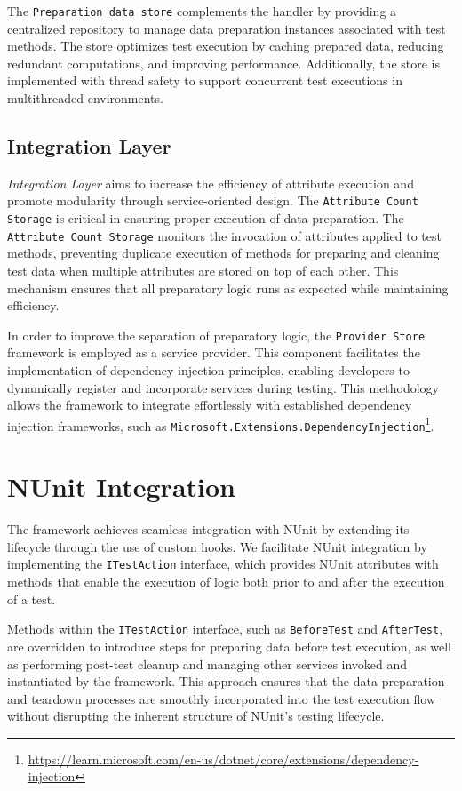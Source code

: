 The \texttt{Preparation data store} complements the handler by providing a centralized repository to manage data preparation instances associated with test methods. The store optimizes test execution by caching prepared data, reducing redundant computations, and improving performance. Additionally, the store is implemented with thread safety to support concurrent test executions in multithreaded environments.

\subsection{Integration Layer}
\textit{Integration Layer} aims to increase the efficiency of attribute execution and promote modularity through service-oriented design.
The \texttt{Attribute Count Storage} is critical in ensuring proper execution of data preparation. The \texttt{Attribute Count Storage} monitors the invocation of attributes applied to test methods, preventing duplicate execution of methods for preparing and cleaning test data when multiple attributes are stored on top of each other. This mechanism ensures that all preparatory logic runs as expected while maintaining efficiency.

In order to improve the separation of preparatory logic, the \texttt{Provider Store} framework is employed as a service provider. This component facilitates the implementation of dependency injection principles, enabling developers to dynamically register and incorporate services during testing. This methodology allows the framework to integrate effortlessly with established dependency injection frameworks, such as \texttt{Microsoft.Extensions.DependencyInjection}\footnote{\href{https://learn.microsoft.com/en-us/dotnet/core/extensions/dependency-injection}{https://learn.microsoft.com/en-us/dotnet/core/extensions/dependency-injection}}.


\section{NUnit Integration}
The framework achieves seamless integration with NUnit by extending its lifecycle through the use of custom hooks. We facilitate NUnit integration by implementing the \texttt{ITestAction} interface, which provides NUnit attributes with methods that enable the execution of logic both prior to and after the execution of a test.

Methods within the \texttt{ITestAction} interface, such as \texttt{BeforeTest} and \texttt{AfterTest}, are overridden to introduce steps for preparing data before test execution, as well as performing post-test cleanup and managing other services invoked and instantiated by the framework. This approach ensures that the data preparation and teardown processes are smoothly incorporated into the test execution flow without disrupting the inherent structure of NUnit's testing lifecycle.

